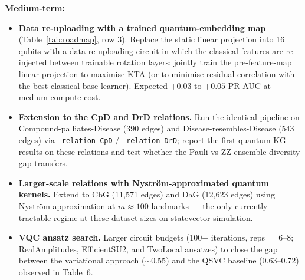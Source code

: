 \documentclass[twocolumn,10pt]{article}
\begin{document}
\vspace{0.6em}
\noindent\textbf{Medium-term:}
\begin{itemize}[leftmargin=*]
\item \textbf{Data re-uploading with a trained quantum-embedding map} (Table~\ref{tab:roadmap}, row 3). Replace the static linear projection into 16 qubits with a data re-uploading circuit in which the classical features are re-injected between trainable rotation layers; jointly train the pre-feature-map linear projection to maximise KTA (or to minimise residual correlation with the best classical base learner). Expected $+0.03$ to $+0.05$ PR-AUC at medium compute cost.
\item \textbf{Extension to the CpD and DrD relations.} Run the identical pipeline on Compound-palliates-Disease (390 edges) and Disease-resembles-Disease (543 edges) via \texttt{--relation CpD} / \texttt{--relation DrD}; report the first quantum KG results on these relations and test whether the Pauli-vs-ZZ ensemble-diversity gap transfers.
\item \textbf{Larger-scale relations with Nystr\"{o}m-approximated quantum kernels.} Extend to CbG (11{,}571 edges) and DaG (12{,}623 edges) using Nystr\"{o}m approximation at $m \approx 100$ landmarks --- the only currently tractable regime at these dataset sizes on statevector simulation.
\item \textbf{VQC ansatz search.} Larger circuit budgets (100+ iterations, reps $= 6$--$8$; RealAmplitudes, EfficientSU2, and TwoLocal ansatzes) to close the gap between the variational approach ($\sim 0.55$) and the QSVC baseline ($0.63$--$0.72$) observed in Table~6.
\end{itemize}
\end{document}
